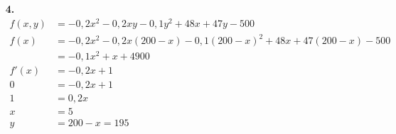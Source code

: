 \documentclass[a4paper,11pt,fleqn]{scrartcl}
\begin{document}
\begin{enumerate}
\item[\textbf{4.}]
	\begin{align*}
		f(x,y)&=-0,2x^2-0,2xy-0,1y^2+48x+47y-500 \\
		f(x)&=-0,2x^2-0,2x\left(200-x\right)-0,1\left(200-x\right)^2+48x+47\left(200-x\right)-500 \\
		&=-0,1x^2+x+4900 \\
		f'(x)&=-0,2x+1 \\
		0&=-0,2x+1\\
		1&=0,2x\\
		x&=5\\
		y&=200-x=195\\
	\end{align*}
\end{enumerate}
\end{document}

